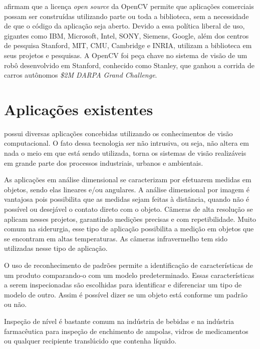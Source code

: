 \cite{opencv:2008:book} afirmam que a licença \textit{open source} da OpenCV permite que aplicações comerciais possam ser construídas utilizando parte ou toda a biblioteca, sem a necessidade de que o código da aplicação seja aberto. Devido a essa política liberal de uso, gigantes como IBM, Microsoft, Intel, SONY, Siemens, Google, além dos centros de pesquisa Stanford, MIT, CMU, Cambridge e INRIA, utilizam a biblioteca em seus projetos e pesquisas. A OpenCV foi peça chave no sistema de visão de um robô desenvolvido em Stanford, conhecido como Stanley, que ganhou a corrida de carros autônomos \textit{\$2M DARPA Grand Challenge}.



\section{Aplicações existentes} %
\label{sec:aplica_es_existentes}

\cite{ivision:2013:online} possui diversas aplicações concebidas utilizando os conhecimentos de visão computacional. O fato dessa tecnologia ser não intrusiva, ou seja, não altera em nada o meio em que está sendo utilizada, torna os sistemas de visão realizáveis em grande parte dos processos industriais, urbanos e ambientais.

As aplicações em análise dimensional se caracterizam por efetuarem medidas em objetos, sendo elas lineares e/ou angulares. A análise dimensional por imagem é vantajosa pois possibilita que as medidas sejam feitas à distância, quando não é possível ou desejável o contato direto com o objeto. Câmeras de alta resolução se aplicam nesses projetos, garantindo medições precisas e com repetibilidade. Muito comum na siderurgia, esse tipo de aplicação possibilita a medição em objetos que se encontram em altas temperaturas. As câmeras infravermelho tem sido utilizadas nesse tipo de aplicação.

O uso de reconhecimento de padrões permite a identificação de características de um produto comparando-o com um modelo predeterminado. Essas características a serem inspecionadas são escolhidas para identificar e diferenciar um tipo de modelo de outro. Assim é possível dizer se um objeto está conforme um padrão ou não.

Inspeção de nível é bastante comum na indústria de bebidas e na indústria farmacêutica para inspeção de enchimento de ampolas, vidros de medicamentos ou qualquer recipiente translúcido que contenha líquido.

